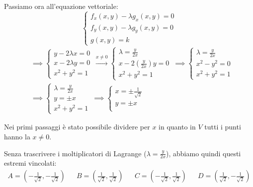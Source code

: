 Passiamo ora all'equazione vettoriale:
\medskip
\begin{equation*}
    \begin{cases}
        f_x(x,y) - \lambda g_x(x,y) = 0 \\
        f_y(x,y) - \lambda g_y(x,y) = 0 \\
        g(x,y) = k
    \end{cases}
\end{equation*}
\smallskip
\begin{equation*}
    \begin{split}
        & \implies
        \begin{cases}
            y -2 \lambda x= 0  \\
            x -2 \lambda y = 0 \\
            x^{2}+ y^{2}= 1
        \end{cases}
        \,\xrightarrow[]{x \ne 0}
        \begin{cases}
            \lambda= \frac{y}{2x}  \\
            x-2( \frac{y}{2x})y= 0 \\
            x^{2}+ y^{2}= 1
        \end{cases}
        \,\implies
        \begin{cases}
            \lambda= \frac{y}{2x} \\
            x^{2}-y^{2}= 0        \\
            x^{2}+ y^{2}= 1
        \end{cases} \\
        & \implies
        \begin{cases}
            \lambda= \frac{y}{2x} \\
            y= \pm x              \\
            x^{2}+ y^{2}= 1
        \end{cases}
        \,\implies
        \begin{cases}
            x = \pm \frac{1}{\sqrt{2}} \\
            y= \pm x                   \\
        \end{cases}
    \end{split}
\end{equation*}

Nei primi passaggi è stato possibile dividere per \(x\) in quanto in \(V\) tutti i punti hanno la \(x \ne 0\).

Senza trascrivere i moltiplicatori di Lagrange (\(\lambda= \frac{y}{2x}\)), abbiamo quindi questi estremi vincolati:
\medskip
\begin{align*}
    A=\left( -\frac{1}{\sqrt{2}}, -\frac{1}{\sqrt{2}} \right)
     &  &
    B=\left(  \frac{1}{\sqrt{2}},  \frac{1}{\sqrt{2}} \right)
     &  &
    C=\left( -\frac{1}{\sqrt{2}},  \frac{1}{\sqrt{2}} \right)
     &  &
    D=\left(  \frac{1}{\sqrt{2}}, -\frac{1}{\sqrt{2}} \right)
\end{align*}

